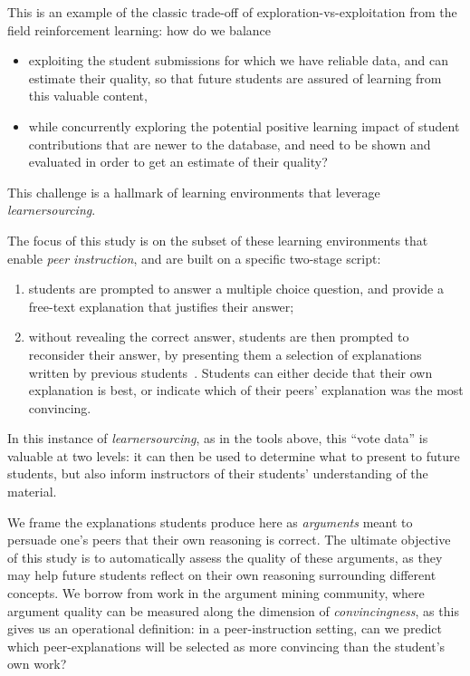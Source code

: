 \documentclass[runningheads]{llncs}
\begin{document}
This is an example of the classic trade-off of exploration-vs-exploitation from 
the field reinforcement learning: how do we balance
\begin{itemize}
	\item exploiting the student 
	submissions for which we have reliable data, and can estimate their 
	quality, so that future students are assured of learning from this valuable 
	content, 
	\item while concurrently exploring the potential positive learning impact 
	of student contributions that are newer to the database, and need to be 
	shown and evaluated in order to get an estimate of their 
	quality?~\cite{williams_axis:_2016} 
\end{itemize}  
This challenge is a hallmark of learning environments that leverage 
\textit{learnersourcing}\cite{weir_learnersourcing_2015}.

The focus of this study is on the subset of these learning 
environments that enable \textit{peer instruction}\cite{crouch_peer_2001}, and 
are built on a specific two-stage script: 
\begin{enumerate}
	\item students are prompted to answer a multiple choice question, and 
	provide a free-text explanation that justifies their answer;
	\item without revealing the correct answer, students are then prompted to 
	reconsider their answer, by presenting them a selection of explanations 
	written by previous students~\cite{bhatnagar_dalite:_2016}.
	Students can either decide that their own explanation is best, or indicate 
	which of their peers' explanation was the most convincing.
\end{enumerate}
In this instance of \textit{learnersourcing}, as in the tools above, this 
``vote data'' is valuable at two levels: it can then be used to determine what 
to present to future students, but also inform instructors of their students' 
understanding of the material.

We frame the explanations students produce here as \textit{arguments} 
meant to persuade one's peers that their own reasoning is correct.
The ultimate objective of this study is to automatically assess the quality of 
these arguments, as they may help future students reflect on their own 
reasoning surrounding different concepts.
We borrow from work in the argument mining community, where argument quality 
can be measured along the dimension of \textit{convincingness}, as this gives 
us an operational definition: in a peer-instruction setting, can we predict 
which peer-explanations will be selected as more convincing than the student's 
own work? 
\end{document}
